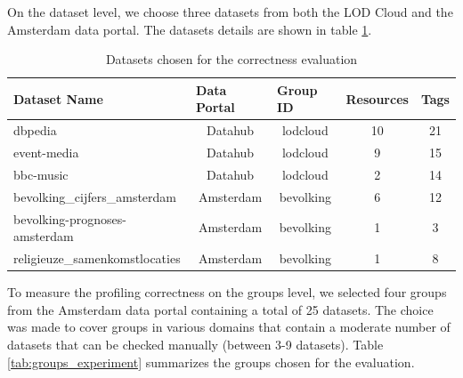 \documentclass[runningheads,a4paper]{llncs}
\begin{document}
On the dataset level, we choose three datasets from both the LOD Cloud and the Amsterdam data portal. The datasets details are shown in table \ref{tab:datases_experiment}.
\begin{table}[ht]
\centering
\footnotesize\setlength{\tabcolsep}{1.5pt}
\begin{tabular}{|l|c|c|c|c|}
\hline
\textbf{Dataset Name}          & \multicolumn{1}{l|}{\textbf{Data Portal}} & \multicolumn{1}{l|}{\textbf{Group ID}} & \multicolumn{1}{l|}{\textbf{Resources}} & \multicolumn{1}{l|}{\textbf{Tags}} \\ \hline
dbpedia                        & Datahub                                   & lodcloud                               & 10                                      & 21                                 \\ \hline
event-media                    & Datahub                                   & lodcloud                               & 9                                       & 15                                 \\ \hline
bbc-music                      & Datahub                                   & lodcloud                               & 2                                       & 14                                 \\ \hline
bevolking\_cijfers\_amsterdam  & Amsterdam                                 & bevolking                              & 6                                       & 12                                 \\ \hline
bevolking-prognoses-amsterdam  & Amsterdam                                 & bevolking                              & 1                                       & 3                                  \\ \hline
religieuze\_samenkomstlocaties & Amsterdam                                 & bevolking                              & 1                                       & 8                                  \\ \hline
\end{tabular}
\caption{Datasets chosen for the correctness evaluation}
\label{tab:datases_experiment}
\end{table}

To measure the profiling correctness on the groups level, we selected four groups from the Amsterdam data portal containing a total of 25 datasets. The choice was made to cover groups in various domains that contain a moderate number of datasets that can be checked manually (between 3-9 datasets). Table \ref{tab:groups_experiment} summarizes the groups chosen for the evaluation.
\end{document}
